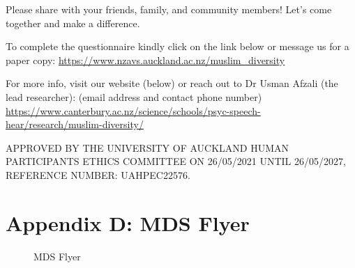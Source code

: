 \documentclass[
]{interact}
\begin{document}
\noindent Please share with your friends, family, and community members!
Let's come together and make a difference.

\noindent To complete the questionnaire kindly click on the link below
or message us for a paper copy:
\url{https://www.nzavs.auckland.ac.nz/muslim_diversity}

\noindent For more info, visit our website (below) or reach out to Dr
Usman Afzali (the lead researcher): (email address and contact phone
number)
\url{https://www.canterbury.ac.nz/science/schools/psyc-speech-hear/research/muslim-diversity/}

\noindent APPROVED BY THE UNIVERSITY OF AUCKLAND HUMAN PARTICIPANTS
ETHICS COMMITTEE ON 26/05/2021 UNTIL 26/05/2027, REFERENCE NUMBER:
UAHPEC22576.

\newpage{}

\section{Appendix D: MDS Flyer}\label{appendix-d-mds-flyer}

\begin{figure}


\caption{\label{fig-appendfig}MDS Flyer}

\end{figure}%
\end{document}
